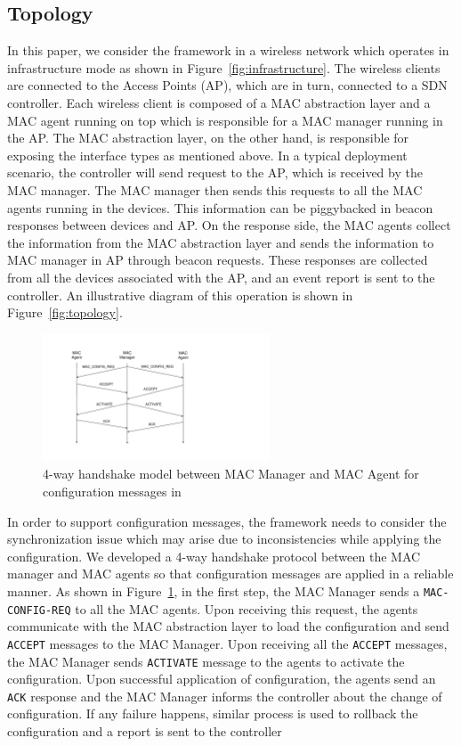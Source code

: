 \subsection{\pmac Topology}
\label{sec:topology}
In this paper, we consider the \pmac framework in a wireless network which operates in infrastructure mode as shown in Figure~\ref{fig:infrastructure}. The wireless clients are connected to the Access Points (AP), which are in turn, connected to a SDN controller. Each wireless client is composed of a MAC abstraction layer and a MAC agent running on top which is responsible for a MAC manager running in the AP. The MAC abstraction layer, on the other hand, is responsible for exposing the interface types as mentioned above. In a typical deployment scenario, the controller will send request to the AP, which is received by the MAC manager. The MAC manager then sends this requests to all the MAC agents running in the devices. This information can be piggybacked in beacon responses between devices and AP. On the response side, the MAC agents collect the information from the MAC abstraction layer and sends the information to MAC manager in AP through beacon requests. These responses are collected from all the devices associated with the AP, and an event report is sent to the controller. An illustrative diagram of this operation is shown in Figure~\ref{fig:topology}. 

\begin{figure}[t]
  \centering
  \includegraphics[width=0.6\textwidth]{figures/protocol.pdf}
  \caption{4-way handshake model between MAC Manager and MAC Agent for configuration messages in \pmac}
  \label{fig:protocol_feature}
\end{figure}

In order to support configuration messages, the \pmac framework needs to consider the synchronization issue which may arise due to inconsistencies  while applying the configuration. We developed a 4-way handshake protocol between the MAC manager and MAC agents so that configuration messages are applied in a reliable manner. As shown in Figure~\ref{fig:protocol_feature}, in the first step, the MAC Manager sends a \texttt{MAC-CONFIG-REQ} to all the MAC agents. Upon receiving this request, the agents communicate with the MAC abstraction layer to load the configuration and send  \texttt{ACCEPT} messages to the MAC Manager. Upon receiving all the \texttt{ACCEPT} messages, the MAC Manager sends \texttt{ACTIVATE} message to the agents to activate the configuration. Upon successful application of configuration, the agents send an \texttt{ACK} response and the MAC Manager informs the controller about the change of configuration. If any failure happens, similar process is used to rollback the configuration and a report is sent to the controller 

